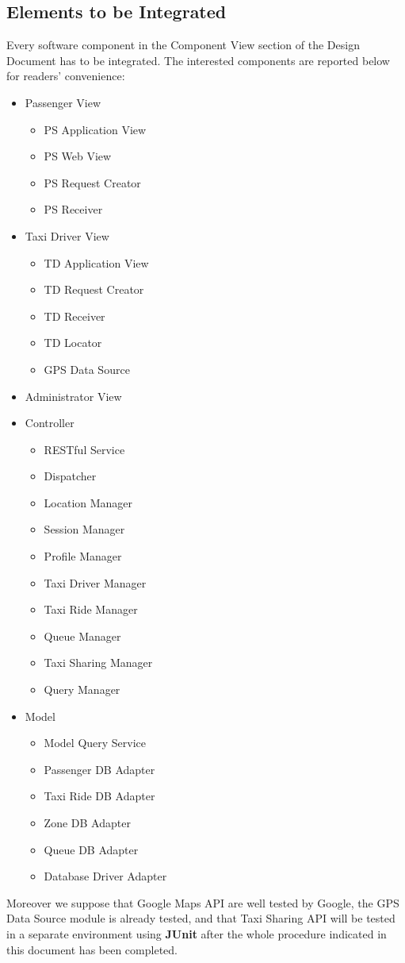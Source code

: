 \subsection{Elements to be Integrated}
Every software component in the Component View section of the Design Document has to be integrated.
The interested components are reported below for readers' convenience:
\begin{itemize}
	\item Passenger View
	\begin{itemize}
		\item PS Application View
		\item PS Web View
		\item PS Request Creator
		\item PS Receiver
	\end{itemize}
	\item Taxi Driver View
	\begin{itemize}
		\item TD Application View
		\item TD Request Creator
		\item TD Receiver
		\item TD Locator
		\item GPS Data Source
	\end{itemize}
	\item Administrator View
	\item Controller
	\begin{itemize}
		\item RESTful Service
		\item Dispatcher
		\item Location Manager
		\item Session Manager
		\item Profile Manager
		\item Taxi Driver Manager
		\item Taxi Ride Manager
		\item Queue Manager
		\item Taxi Sharing Manager
		\item Query Manager
	\end{itemize}
	\item Model
	\begin{itemize}
		\item Model Query Service
		\item Passenger DB Adapter
		\item Taxi Ride DB Adapter
		\item Zone DB Adapter
		\item Queue DB Adapter
		\item Database Driver Adapter
	\end{itemize}
\end{itemize}
Moreover we suppose that Google Maps API are well tested by Google, the GPS Data Source module is already tested, and that \myTaxiService{} Taxi Sharing API will be tested in a separate environment using \textbf{JUnit} after the whole procedure indicated in this document has been completed.
